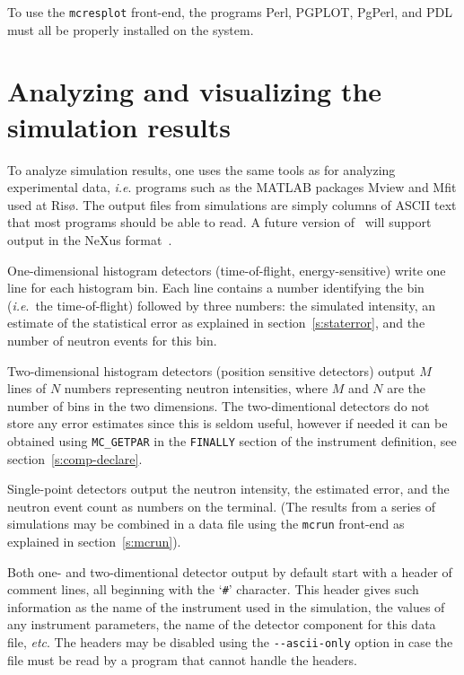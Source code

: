 To use the \verb+mcresplot+ front-end, the programs Perl, PGPLOT, PgPerl,
and PDL must all be properly installed on the system.



\section{Analyzing and visualizing the simulation results}
\label{s:analyze}

To analyze simulation results, one uses the same tools as for analyzing
experimental data, \textit{i.e}. programs such as the MATLAB packages
Mview and Mfit %
used at Ris\o. The output files from
simulations are simply columns of ASCII text that most programs should
be able to read. A future version of \MCS\ will support output in the
NeXus format~\cite{nexus_webpage}.

One-dimensional histogram detectors (time-of-flight, energy-sensitive)
write one line for each histogram bin. Each line contains a number
identifying the bin (\textit{i.e}.\ the time-of-flight) followed by
three numbers: the simulated intensity, an estimate of the statistical
error as explained in section~\ref{s:staterror}, and the number of
neutron events for this bin.

Two-dimensional histogram detectors (position sensitive detectors)
output $M$ lines of $N$ numbers representing neutron intensities, where
$M$ and $N$ are the number of bins in the two dimensions. The
two-dimentional detectors do not store any error estimates since this is
seldom useful, however if needed it can be obtained using
\verb+MC_GETPAR+ in the \verb+FINALLY+ section of the instrument
definition, see section~\ref{s:comp-declare}.

Single-point detectors output the neutron intensity, the estimated
error, and the neutron event count as numbers on the
terminal. (The results from a series of simulations may be combined in a
data file using the \verb+mcrun+ front-end as explained in
section~\ref{s:mcrun}).

Both one- and two-dimentional detector output by default start with a
header of comment lines, all beginning with the `\verb+#+' character.
This header gives such information as the name of the instrument used in
the simulation, the values of any instrument parameters, the name of the
detector component for this data file, \textit{etc}. The headers may be
disabled using the \verb+--ascii-only+ option in case the file must be
read by a program that cannot handle the headers.

